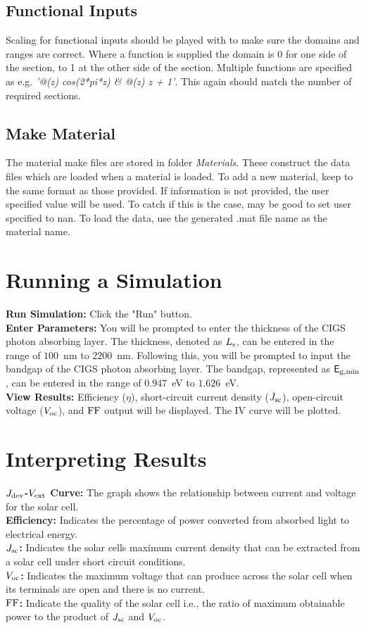 \documentclass[10pt]{article}
\def\Ls{L_{\rm s}}
\def\sfE{{\sf E}}
\def\ego{\sfE_{\rm g,min}}
\def\Jsc{J_{SC}}
\def\Voc{V_{oc}}
\def\Voc{V_{OC}}
\def\Ls{L_{\rm s}}
\def\sfE{{\sf E}}
\def\ego{\sfE_{\rm g,min}}
\def\Jsc{J_{\rm sc}}
\def\FF{{\rm FF}}
\def\Jdev{J_{\rm dev}}
\def\Voc{V_{\rm oc}}
\def\Vext{V_{\rm ext}}
\begin{document}
\subsection{Functional Inputs}
Scaling for functional inputs should be played with to make sure the domains and ranges are correct. Where a function is supplied the domain is 0 for one side of the section, to 1 at the other side of the section. Multiple functions are specified as e.g. \emph{'@(z) cos(2*pi*z) \& @(z) z + 1'}. This again should match the number of required sections.


\subsection{Make Material}
The material make files are stored in folder \emph{Materials}. These construct the data files which are loaded when a material is loaded. To add a new material, keep to the same format as those provided. If information is not provided, the user specified value will be used. To catch if this is the case, may be good to set user specified to nan. To load the data, use the generated .mat file name as the material name.




\section{Running a Simulation}
\textbf{Run Simulation:} Click the "Run" button.\\
\textbf{Enter Parameters:} You will be prompted to enter the thickness of the CIGS photon absorbing layer. The thickness, denoted as $\Ls$, can be entered in the range of $100$~nm to $2200$~nm. Following this, you will be prompted to input the bandgap of the CIGS photon absorbing layer. The bandgap, represented as $\ego$, can be entered in the range of $0.947$~eV to $1.626$~eV. \\
\textbf{View Results:} Efficiency ($\eta$), short-circuit current density ($\Jsc$), open-circuit voltage ($\Voc$), and $\FF$ output will be displayed. The IV curve will be plotted.\\
\section{Interpreting Results}
\textbf{$\Jdev$-$\Vext$ Curve:} The graph shows the relationship between current and voltage for the solar cell.\\
\textbf{Efficiency:} Indicates the percentage of power converted from absorbed light to electrical energy.\\
\textbf{$\Jsc$:} Indicates the solar cells maximum current density that can be extracted from a solar cell under short circuit conditions.\\
\textbf{$\Voc$:}  Indicates the maximum voltage that can produce across the solar cell when its terminals are open and there is no current.\\
\textbf{$\FF$:} Indicate the quality of the solar cell i.e., the ratio of maximum obtainable power to the product of $\Jsc$ and $\Voc$. 
\end{document}
